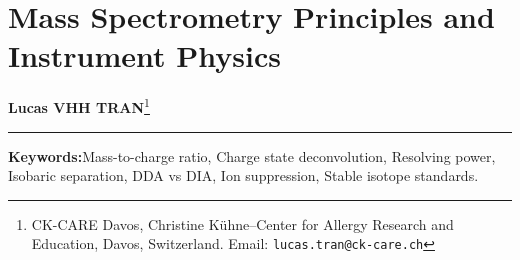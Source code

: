 \documentclass[11pt,twoside,openright]{book}
\begin{document}
\setcounter{chapter}{1}
\chapter{Mass Spectrometry Principles and Instrument Physics}
\label{chap:what_is_ms}

\noindent
\textbf{Lucas VHH TRAN}\footnote{CK-CARE Davos, Christine K\"uhne--Center for Allergy Research and Education, Davos, Switzerland. Email: \texttt{lucas.tran@ck-care.ch}}\\
\rule{\textwidth}{0.8pt}

\begin{abstract}
\noindent
Mass spectrometers operate as physical sensors that convert gas-phase ions into digitized mass-to-charge ratios ($m/z$) and ion-current intensities. Neutral molecules cannot be detected directly; they must acquire electric charge through electron ionization (EI), electrospray ionization (ESI) \cite{fenn1989electrospray}, or matrix-assisted laser desorption/ionization (MALDI) \cite{karas1988laser}. Because the instrument measures $m/z$ rather than uncharged mass, molecular identity must be derived by deconvoluting integer charge states ($z$) from isotopic peak spacing. Instrument mass analyzers---quadrupoles \cite{paul1990electromagnetic}, time-of-flight (TOF) \cite{guilhaus1995principles}, and Orbitraps \cite{makarov2000orbitrap, marshall1998fourier}---differ by orders of magnitude in resolving power and mass accuracy \cite{zubarev2007persistent, gross2017mass}, setting physical boundaries on isobaric separation. Furthermore, the choice of acquisition strategy governs data completeness: data-dependent acquisition (DDA) introduces stochastic missingness through top-$N$ precursor selection \cite{domon2010options, michalski2011more}, whereas data-independent acquisition (DIA) captures multiplexed fragmentation arrays at the expense of computational deconvolution \cite{gillet2012targeted, venable2004automated, demichev2020dia}. This chapter presents the physical governing equations, charge deconvolution algorithms, resolving power thresholds, and matrix suppression kinetics that define mass spectrometry data structures in R 4.6.1 \cite{domon2006ms, gross2017mass}.
\end{abstract}

\vspace{1em}
\noindent\textbf{Keywords:}\enspace Mass-to-charge ratio, Charge state deconvolution, Resolving power, Isobaric separation, DDA vs DIA, Ion suppression, Stable isotope standards.
\end{document}

